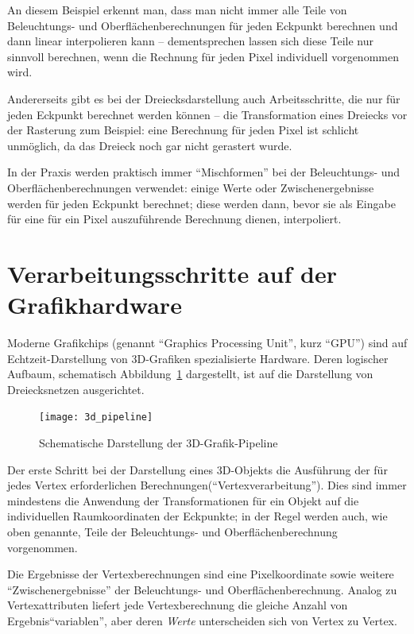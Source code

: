 \documentclass[twoside,a4paper,fleqn,12pt]{book}
\begin{document}
An diesem Beispiel erkennt man, dass man nicht immer alle Teile von Beleuchtungs- und Oberflächenberechnungen für jeden Eckpunkt berechnen und
dann linear interpolieren kann -- dementsprechen lassen sich diese Teile nur sinnvoll berechnen, wenn die Rechnung für jeden Pixel individuell vorgenommen wird.

Andererseits gibt es bei der Dreiecksdarstellung auch Arbeitsschritte, die nur für jeden Eckpunkt berechnet werden können -- die Transformation eines
Dreiecks vor der Rasterung zum Beispiel: eine Berechnung für jeden Pixel ist schlicht unmöglich, da das Dreieck noch gar nicht gerastert wurde.

In der Praxis werden praktisch immer "`Mischformen"' bei der Beleuchtungs- und Oberflächenberechnungen verwendet: einige Werte oder
Zwischenergebnisse werden für jeden Eckpunkt berechnet; diese werden dann, bevor sie als Eingabe für eine für ein Pixel auszuführende
Berechnung dienen, interpoliert.

\section{Verarbeitungsschritte auf der Grafikhardware}
\label{hw_steps}

Moderne Grafikchips (genannt ``Graphics Processing Unit'', kurz ``GPU'') sind auf Echtzeit-Darstellung von 3D-Grafiken spezialisierte Hardware.
Deren logischer Aufbaum, schematisch Abbildung~\ref{fig:3d_pipeline} dargestellt, ist auf die Darstellung von Dreiecksnetzen ausgerichtet. 

\begin{figure}[h]
  \centering
  \texttt{[image: 3d\_pipeline]}
  \caption{Schematische Darstellung der 3D-Grafik-Pipeline}
  \label{fig:3d_pipeline}
\end{figure}

Der erste Schritt bei der Darstellung
eines 3D-Objekts die Ausführung der für jedes Vertex erforderlichen Berechnungen("`Vertexverarbeitung"').
Dies sind immer mindestens die Anwendung der Transformationen für ein Objekt auf die individuellen Raumkoordinaten der Eckpunkte;
in der Regel werden auch, wie oben genannte, Teile der Beleuchtungs- und Oberflächenberechnung vorgenommen.

Die Ergebnisse der Vertexberechnungen sind eine Pixelkoordinate sowie weitere "`Zwischenergebnisse"' der Beleuchtungs- und Oberflächenberechnung.
Analog zu Vertexattributen liefert jede Vertexberechnung die gleiche Anzahl von Ergebnis"`variablen"', aber deren \emph{Werte} unterscheiden sich
von Vertex zu Vertex.
\end{document}

